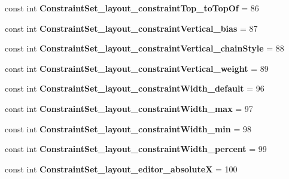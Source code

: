 \begin{DoxyCompactItemize}
const int {\bfseries Constraint\+Set\+\_\+layout\+\_\+constraint\+Top\+\_\+to\+Top\+Of} = 86
\item 
\mbox{\label{classst_delivery_1_1_resource_1_1_styleable_afce38abfc562628a1a1f65d6c1504d3b}} 
const int {\bfseries Constraint\+Set\+\_\+layout\+\_\+constraint\+Vertical\+\_\+bias} = 87
\item 
\mbox{\label{classst_delivery_1_1_resource_1_1_styleable_a86c1ed8b7257b209316404d44d9d88ce}} 
const int {\bfseries Constraint\+Set\+\_\+layout\+\_\+constraint\+Vertical\+\_\+chain\+Style} = 88
\item 
\mbox{\label{classst_delivery_1_1_resource_1_1_styleable_aa789789e5fc4b0bae4253843513d171d}} 
const int {\bfseries Constraint\+Set\+\_\+layout\+\_\+constraint\+Vertical\+\_\+weight} = 89
\item 
\mbox{\label{classst_delivery_1_1_resource_1_1_styleable_a4b2a5d9205a352ddb77fde6354885284}} 
const int {\bfseries Constraint\+Set\+\_\+layout\+\_\+constraint\+Width\+\_\+default} = 96
\item 
\mbox{\label{classst_delivery_1_1_resource_1_1_styleable_ab691ab65f41efaa56c6d80add680f0fa}} 
const int {\bfseries Constraint\+Set\+\_\+layout\+\_\+constraint\+Width\+\_\+max} = 97
\item 
\mbox{\label{classst_delivery_1_1_resource_1_1_styleable_af0584aa7eb8533b2b1882d7db5412cef}} 
const int {\bfseries Constraint\+Set\+\_\+layout\+\_\+constraint\+Width\+\_\+min} = 98
\item 
\mbox{\label{classst_delivery_1_1_resource_1_1_styleable_a8a1cf504399abb53555fa1953c8c19a8}} 
const int {\bfseries Constraint\+Set\+\_\+layout\+\_\+constraint\+Width\+\_\+percent} = 99
\item 
\mbox{\label{classst_delivery_1_1_resource_1_1_styleable_af116adc8673eced88bdef52777216a32}} 
const int {\bfseries Constraint\+Set\+\_\+layout\+\_\+editor\+\_\+absoluteX} = 100

\end{DoxyCompactItemize}
